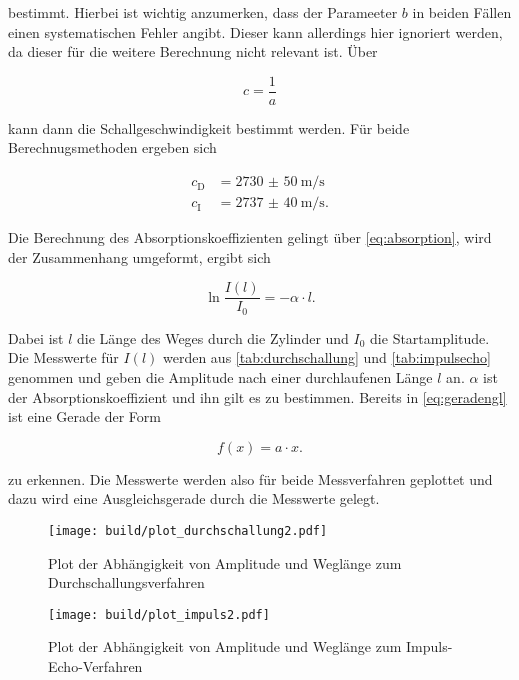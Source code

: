 bestimmt.
Hierbei ist wichtig anzumerken, dass der Parameeter $b$ in beiden Fällen einen systematischen Fehler angibt.
Dieser kann allerdings hier ignoriert werden, da dieser für die weitere Berechnung nicht relevant ist.
Über 

\begin{equation}
    c = \frac{1}{a}
\end{equation}

kann dann die Schallgeschwindigkeit bestimmt werden.
Für beide Berechnugsmethoden ergeben sich

\begin{align}
    c_\text{D} &= \SI{2730(50)}{\meter\per\second}\\
    c_\text{I} &= \SI{2737(40)}{\meter\per\second}.
\end{align}

Die Berechnung des Absorptionskoeffizienten gelingt über \eqref{eq:absorption}, wird der Zusammenhang umgeformt, ergibt sich 

\begin{equation}
    \ln{\frac{I(l)}{I_0}} = - \alpha \cdot l.
    \label{eq:geradengl}
\end{equation}

Dabei ist $l$ die Länge des Weges durch die Zylinder und $I_0$ die Startamplitude.
Die Messwerte für $I(l)$ werden aus \autoref{tab:durchschallung} und \autoref{tab:impulsecho} genommen und geben die Amplitude nach einer durchlaufenen Länge $l$ an.
$\alpha$ ist der Absorptionskoeffizient und ihn gilt es zu bestimmen. 
Bereits in \eqref{eq:geradengl} ist eine Gerade der Form 

\begin{equation}
    f(x) = a \cdot x.
    \label{eq:geradengl2}
\end{equation}

zu erkennen.
Die Messwerte werden also für beide Messverfahren geplottet und dazu wird eine Ausgleichsgerade durch die Messwerte gelegt.

\begin{figure}
    \centering
    \texttt{[image: build/plot\_durchschallung2.pdf]}
    \caption{Plot der Abhängigkeit von Amplitude und Weglänge zum Durchschallungsverfahren}
    \label{fig:durch2}
\end{figure}

\begin{figure}
    \centering
    \texttt{[image: build/plot\_impuls2.pdf]}
    \caption{Plot der Abhängigkeit von Amplitude und Weglänge zum Impuls-Echo-Verfahren}
    \label{fig:impuls2}
\end{figure}

